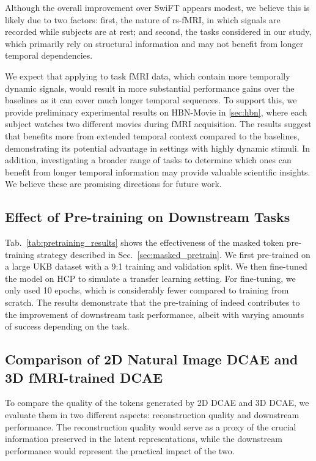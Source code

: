 Although the overall improvement over SwiFT appears modest, we believe this is likely due to two factors: first, the nature of rs-fMRI, in which signals are recorded while subjects are at rest; and second, the tasks considered in our study, which primarily rely on structural information and may not benefit from longer temporal dependencies.

We expect that applying {\ours} to task fMRI data, which contain more temporally dynamic signals, would result in more substantial performance gains over the baselines as it can cover much longer temporal sequences. 
To support this, we provide preliminary experimental results on HBN-Movie \cite{HBN} in \cref{sec:hbn}, where each subject watches two different movies during fMRI acquisition. The results suggest that {\ours} benefits more from extended temporal context compared to the baselines, demonstrating its potential advantage in settings with highly dynamic stimuli.
In addition, investigating a broader range of tasks to determine which ones can benefit from longer temporal information may provide valuable scientific insights. We believe these are promising directions for future work.

\subsection{Effect of Pre-training on Downstream Tasks}
Tab.~\ref{tab:pretraining_results} shows the effectiveness of the masked token pre-training strategy described in Sec.~\ref{sec:masked_pretrain}.
We first pre-trained {\ours} on a large UKB dataset with a 9:1 training and validation split. We then fine-tuned the model on HCP to simulate a transfer learning setting. 
For fine-tuning, we only used 10 epochs, which is considerably fewer compared to training from scratch.
The results demonstrate that the pre-training of {\ours} indeed contributes to the improvement of downstream task performance, albeit with varying amounts of success depending on the task.
\label{sec:pretraining_results}



\subsection{Comparison of 2D Natural Image DCAE and 3D fMRI-trained DCAE}

\label{sec:recon_quality}


To compare the quality of the tokens generated by 2D DCAE and 3D DCAE, we evaluate them in two different aspects: reconstruction quality and downstream performance. The reconstruction quality would serve as a proxy of the crucial information preserved in the latent representations, while the downstream performance would represent the practical impact of the two.

